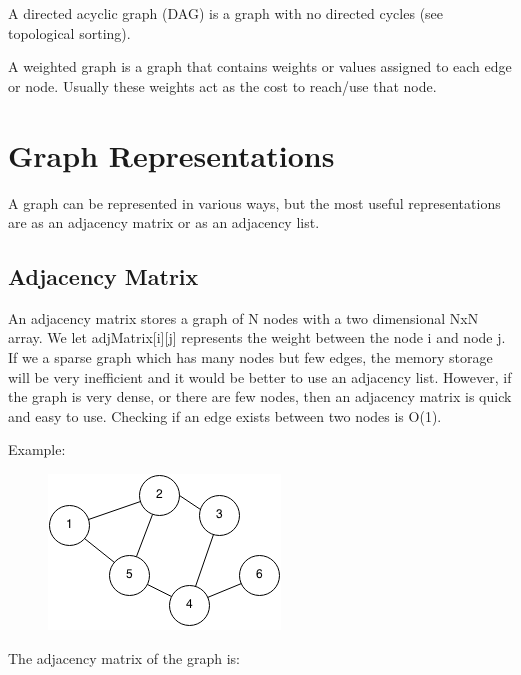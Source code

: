 \documentclass[11pt,oneside]{book}
\makeatletter
\def\maxwidth#1{\ifdim\Gin@nat@width>#1 #1\else\Gin@nat@width\fi}
\makeatother
\begin{document}
A directed acyclic graph (DAG) is a graph with no directed cycles (see topological sorting).

A weighted graph is a graph that contains weights or values assigned to each edge or node. Usually these weights act as the cost to reach/use that node.


    \chapter{ Graph Representations }
        

A graph can be represented in various ways, but the most useful representations are as an adjacency matrix or as an adjacency list.


        \section{ Adjacency Matrix }
        

An adjacency matrix stores a graph of N nodes with a two dimensional NxN array. We let adjMatrix[i][j] represents the weight between the node i and node j. If we a sparse graph which has many nodes but few edges, the memory storage will be very inefficient and it would be better to use an adjacency list. However, if the graph is very dense, or there are few nodes, then an adjacency matrix is quick and easy to use. Checking if an edge exists between two nodes is O(1).

Example:

\vspace{5px}\begin{figure}[H]\centering
        \includegraphics[width=0.66\maxwidth{\textwidth}]{graph.png}
        \end{figure}

The adjacency matrix of the graph is:
\end{document}
